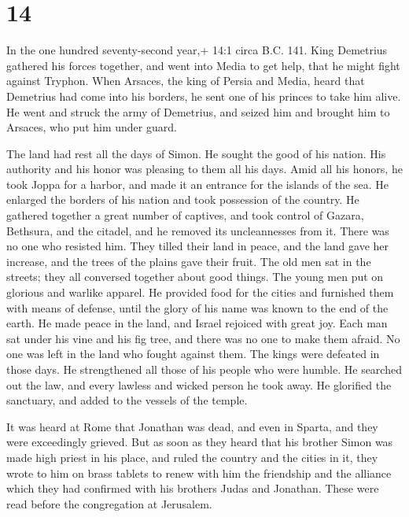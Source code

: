\hypertarget{section-13}{%
\section{14}\label{section-13}}

 In the one hundred seventy-second year,+ 14:1 circa B.C.
141. King Demetrius gathered his forces together, and went into Media to
get help, that he might fight against Tryphon.  When
Arsaces, the king of Persia and Media, heard that Demetrius had come
into his borders, he sent one of his princes to take him alive.
 He went and struck the army of Demetrius, and seized him
and brought him to Arsaces, who put him under guard.

 The land had rest all the days of Simon. He sought the good
of his nation. His authority and his honor was pleasing to them all his
days.  Amid all his honors, he took Joppa for a harbor, and
made it an entrance for the islands of the sea.  He enlarged
the borders of his nation and took possession of the country.
 He gathered together a great number of captives, and took
control of Gazara, Bethsura, and the citadel, and he removed its
uncleannesses from it. There was no one who resisted him. 
They tilled their land in peace, and the land gave her increase, and the
trees of the plains gave their fruit.  The old men sat in
the streets; they all conversed together about good things. The young
men put on glorious and warlike apparel.  He provided food
for the cities and furnished them with means of defense, until the glory
of his name was known to the end of the earth.  He made
peace in the land, and Israel rejoiced with great joy. 
Each man sat under his vine and his fig tree, and there was no one to
make them afraid.  No one was left in the land who fought
against them. The kings were defeated in those days.  He
strengthened all those of his people who were humble. He searched out
the law, and every lawless and wicked person he took away. 
He glorified the sanctuary, and added to the vessels of the temple.

 It was heard at Rome that Jonathan was dead, and even in
Sparta, and they were exceedingly grieved.  But as soon as
they heard that his brother Simon was made high priest in his place, and
ruled the country and the cities in it,  they wrote to him
on brass tablets to renew with him the friendship and the alliance which
they had confirmed with his brothers Judas and Jonathan. 
These were read before the congregation at Jerusalem.

